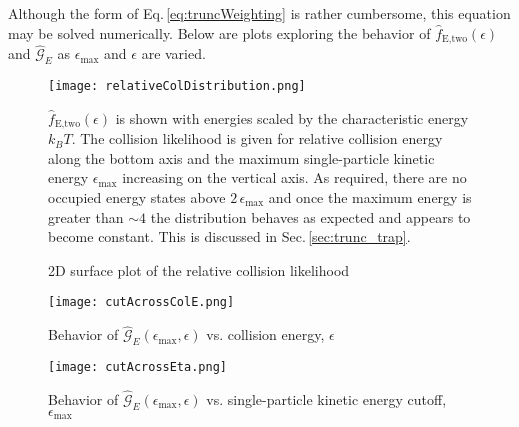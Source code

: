Although the form of Eq.\,\ref{eq:truncWeighting} is rather cumbersome, this equation may be solved numerically.
Below are plots exploring the behavior of $\hat{f}_\text{E,two}(\epsilon)$ and $\hat{\mathcal{G}}_E$ as $\epsilon_\text{max}$ and $\epsilon$ are varied.
\begin{figure}
	\centerline{
	\texttt{[image: relativeColDistribution.png]}}
	\caption{2D surface plot of the relative collision likelihood}{$\hat{f}_\text{E,two}(\epsilon)$ is shown with energies scaled by the characteristic energy $k_B T$. The collision likelihood is given for relative collision energy along the bottom axis and the maximum single-particle kinetic energy $\epsilon_\text{max}$ increasing on the vertical axis. As required, there are no occupied energy states above $2\,\epsilon_\text{max}$ and once the maximum energy is greater than $\sim\!4$ the distribution behaves as expected and appears to become constant. This is discussed in Sec.\,\ref{sec:trunc_trap}.}
	\label{fig:momSurfRelCol}
\end{figure} 

\begin{figure}
	\centerline{
	\texttt{[image: cutAcrossColE.png]}}
	\caption{Behavior of $\hat{\mathcal{G}}_E(\epsilon_\text{max}, \epsilon)$ vs. collision energy, $\epsilon$}
	\label{fig:relColvsColE}
\end{figure} 

\begin{figure}
	\centerline{
	\texttt{[image: cutAcrossEta.png]}}
	\caption{Behavior of $\hat{\mathcal{G}}_E(\epsilon_\text{max}, \epsilon)$ vs. single-particle kinetic energy cutoff, $\epsilon_\text{max}$}
	\label{fig:relColvsEta}
\end{figure} 



%
%
